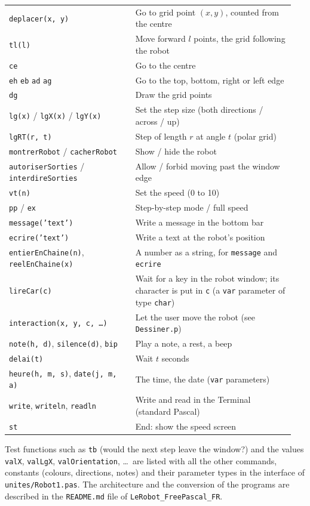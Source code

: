 \documentclass[11pt,a4paper]{article}
\newcommand{\kbd}[1]{\texttt{#1}}
\begin{document}
\begin{longtable}{@{}p{0.42\linewidth} p{0.53\linewidth}@{}}
\kbd{deplacer(x, y)} & Go to grid point $(x, y)$, counted from the centre \\
\kbd{tl(l)} & Move forward $l$ points, the grid following the robot \\
\kbd{ce} & Go to the centre \\
\kbd{eh} \kbd{eb} \kbd{ad} \kbd{ag} & Go to the top, bottom, right or left edge \\
\kbd{dg} & Draw the grid points \\
\kbd{lg(x)} / \kbd{lgX(x)} / \kbd{lgY(x)} & Set the step size (both directions / across / up) \\
\kbd{lgRT(r, t)} & Step of length $r$ at angle $t$ (polar grid) \\
\kbd{montrerRobot} / \kbd{cacherRobot} & Show / hide the robot \\
\kbd{autoriserSorties} / \kbd{interdireSorties} & Allow / forbid moving past the window edge \\
\kbd{vt(n)} & Set the speed (0 to 10) \\
\kbd{pp} / \kbd{ex} & Step-by-step mode / full speed \\
\kbd{message('text')} & Write a message in the bottom bar \\
\kbd{ecrire('text')} & Write a text at the robot's position \\
\kbd{entierEnChaine(n)}, \kbd{reelEnChaine(x)} & A number as a string, for \kbd{message} and \kbd{ecrire} \\
\kbd{lireCar(c)} & Wait for a key in the robot window; its character is put in \kbd{c} (a \kbd{var} parameter of type \kbd{char}) \\
\kbd{interaction(x, y, c, \dots)} & Let the user move the robot (see \kbd{Dessiner.p}) \\
\kbd{note(h, d)}, \kbd{silence(d)}, \kbd{bip} & Play a note, a rest, a beep \\
\kbd{delai(t)} & Wait $t$ seconds \\
\kbd{heure(h, m, s)}, \kbd{date(j, m, a)} & The time, the date (\kbd{var} parameters) \\
\kbd{write}, \kbd{writeln}, \kbd{readln} & Write and read in the Terminal (standard Pascal) \\
\kbd{st} & End: show the speed screen \\
\end{longtable}

Test functions such as \kbd{tb} (would the next step leave the window?)
and the values \kbd{valX}, \kbd{valLgX}, \kbd{valOrientation}, \dots\ are
listed with all the other commands, constants (colours, directions, notes)
and their parameter types in the interface of
\kbd{unites/Robot1.pas}. The architecture and the conversion of the
programs are described in the \kbd{README.md} file of
\kbd{LeRobot\_FreePascal\_FR}.
\end{document}
